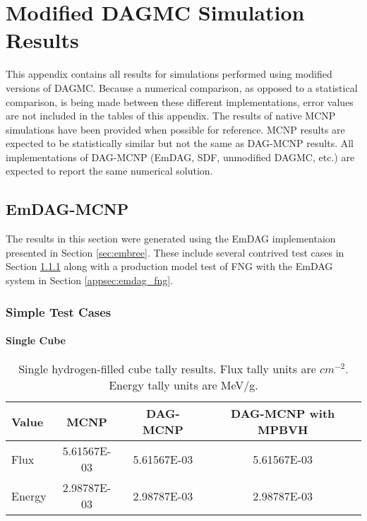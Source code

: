 
\chapter{Modified DAGMC Simulation Results}\label{ch:appendix-c}

This appendix contains all results for simulations performed using modified
versions of DAGMC. Because a numerical comparison, as opposed to a statistical
comparison, is being made between these different implementations, error values
are not included in the tables of this appendix. The results of native MCNP
simulations have been provided when possible for reference. MCNP results are
expected to be statistically similar but not the same as DAG-MCNP results. All
implementations of DAG-MCNP (EmDAG, SDF, unmodified DAGMC, etc.) are expected to
report the same numerical solution.

\section{EmDAG-MCNP}

The results in this section were generated using the EmDAG
implementaion presented in Section \ref{sec:embree}. These include several
contrived test cases in Section \ref{appsec:emdag_simple_tests} along with a
production model test of FNG with the EmDAG system in Section \ref{appsec:emdag_fng}.

\subsection{Simple Test Cases}\label{appsec:emdag_simple_tests}
  \subsubsection{Single Cube}

  \begin{table}[H]
    \small
    \begin{center}
      \begin{tabular}{lccc}
        \toprule
        Value & MCNP & DAG-MCNP & DAG-MCNP with MPBVH \\
        \toprule
        \hline
        Flux   & 5.61567E-03 & 5.61567E-03 & 5.61567E-03 \\
        Energy & 2.98787E-03 & 2.98787E-03 & 2.98787E-03 \\
        \bottomrule
      \end{tabular}
      \caption[Single hydrogen-filled cube tally results.]{Single
        hydrogen-filled cube tally results. Flux tally units are
        $cm^{-2}$. Energy tally units are MeV/g.}
      \label{nestedspheres}
    \end{center}
  \end{table}


